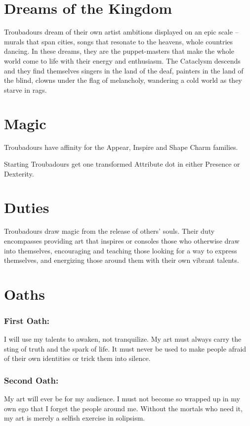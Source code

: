\section*{Dreams of the Kingdom}

Troubadours dream of their own artist ambitions displayed on an epic scale – murals that span cities, songs that resonate to the heavens, whole countries dancing. In these dreams, they are the puppet-masters that make the whole world come to life with their energy and enthusiasm. The Cataclysm descends and they find themselves singers in the land of the deaf, painters in the land of the blind, clowns under the flag of melancholy, wandering a cold world as they starve in rags. 

\section*{Magic}
Troubadours have affinity for the Appear, Inspire and Shape Charm families.

Starting Troubadours get one transformed Attribute dot in either Presence or Dexterity. 

\section*{Duties}
Troubadours draw magic from the release of others' souls. Their duty encompasses providing art that inspires or consoles those who otherwise draw into themselves, encouraging and teaching those looking for a way to express themselves, and energizing those around them with their own vibrant talents. 
\section*{Oaths}
\subsubsection*{First Oath:} I will use my talents to awaken, not tranquilize. My art must always carry the sting of truth and the spark of life. It must never be used to make people afraid of their own identities or trick them into silence. 

\subsubsection*{Second Oath:}My art will ever be for my audience. I must not become so wrapped up in my own ego that I forget the people around me. Without the mortals who need it, my art is merely a selfish exercise in solipsism. 

